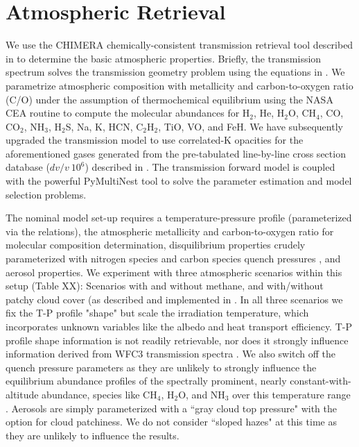 \documentclass[twocolumn]{aastex61}
\begin{document}
\section{Atmospheric Retrieval}
We use the CHIMERA chemically-consistent transmission retrieval tool described in \cite{kreidberg15b} to determine the basic atmospheric properties.   Briefly, the transmission spectrum solves the transmission geometry problem using the equations in \cite{brown01, tinetti12}.  We parametrize atmospheric composition with metallicity and carbon-to-oxygen ratio (C/O) under the assumption of thermochemical equilibrium using the NASA CEA routine \citep{gordon96} to compute the molecular abundances for H$_2$, He, H$_2$O, CH$_4$, CO, CO$_2$, NH$_3$, H$_2$S, Na, K, HCN, C$_2$H$_2$, TiO, VO, and FeH.    We have subsequently upgraded the transmission model to use correlated-K opacities \citep{lacis91, molliere15, amundsen16} for the aforementioned gases generated from the pre-tabulated line-by-line cross section database ($dv/v~10^6$) described in \cite{freedman14}. The transmission forward model is coupled with the powerful PyMultiNest tool \citep{buchner16} to solve the parameter estimation and model selection problems.  

The nominal model set-up requires a temperature-pressure profile (parameterized via the \citealt{guillot10} relations), the atmospheric metallicity and carbon-to-oxygen ratio for molecular composition determination, disquilibrium properties crudely parameterized with nitrogen species and carbon species quench pressures \citep{morley17}, and aerosol properties.  We experiment with three atmospheric scenarios within this setup (Table XX):  Scenarios with and without methane, and with/without patchy cloud cover (as described and implemented in \citealt{line16}.  In all three scenarios we fix the T-P profile "shape" but scale the irradiation temperature, which incorporates unknown variables like the albedo and heat transport efficiency.  T-P profile shape information is not readily retrievable, nor does it strongly influence information derived from WFC3 transmission spectra \citep[e.g.][]{kreidberg15b}. We also switch off the quench pressure parameters as they are unlikely to strongly influence the equilibrium abundance profiles of the spectrally prominent, nearly constant-with-altitude abundance, species like CH$_4$, H$_2$O, and NH$_3$ over this temperature range \citep[e.g.][]{line11, moses13}.  Aerosols are simply parameterized with a ``gray cloud top pressure" with the option for cloud patchiness. We do not consider ``sloped hazes" at this time as they are unlikely to influence the results.
\end{document}
